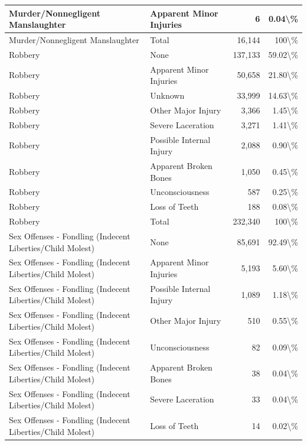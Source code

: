 \documentclass[
]{krantz}
\begin{document}
\begin{longtable}[t]{l|l|r|r}
\hline
Murder/Nonnegligent Manslaughter & Apparent Minor Injuries & 6 & 0.04\textbackslash{}\%\\
\hline
Murder/Nonnegligent Manslaughter & Total & 16,144 & 100\textbackslash{}\%\\
\hline
Robbery & None & 137,133 & 59.02\textbackslash{}\%\\
\hline
Robbery & Apparent Minor Injuries & 50,658 & 21.80\textbackslash{}\%\\
\hline
Robbery & Unknown & 33,999 & 14.63\textbackslash{}\%\\
\hline
Robbery & Other Major Injury & 3,366 & 1.45\textbackslash{}\%\\
\hline
Robbery & Severe Laceration & 3,271 & 1.41\textbackslash{}\%\\
\hline
Robbery & Possible Internal Injury & 2,088 & 0.90\textbackslash{}\%\\
\hline
Robbery & Apparent Broken Bones & 1,050 & 0.45\textbackslash{}\%\\
\hline
Robbery & Unconsciousness & 587 & 0.25\textbackslash{}\%\\
\hline
Robbery & Loss of Teeth & 188 & 0.08\textbackslash{}\%\\
\hline
Robbery & Total & 232,340 & 100\textbackslash{}\%\\
\hline
Sex Offenses - Fondling (Indecent Liberties/Child Molest) & None & 85,691 & 92.49\textbackslash{}\%\\
\hline
Sex Offenses - Fondling (Indecent Liberties/Child Molest) & Apparent Minor Injuries & 5,193 & 5.60\textbackslash{}\%\\
\hline
Sex Offenses - Fondling (Indecent Liberties/Child Molest) & Possible Internal Injury & 1,089 & 1.18\textbackslash{}\%\\
\hline
Sex Offenses - Fondling (Indecent Liberties/Child Molest) & Other Major Injury & 510 & 0.55\textbackslash{}\%\\
\hline
Sex Offenses - Fondling (Indecent Liberties/Child Molest) & Unconsciousness & 82 & 0.09\textbackslash{}\%\\
\hline
Sex Offenses - Fondling (Indecent Liberties/Child Molest) & Apparent Broken Bones & 38 & 0.04\textbackslash{}\%\\
\hline
Sex Offenses - Fondling (Indecent Liberties/Child Molest) & Severe Laceration & 33 & 0.04\textbackslash{}\%\\
\hline
Sex Offenses - Fondling (Indecent Liberties/Child Molest) & Loss of Teeth & 14 & 0.02\textbackslash{}\%\\

\end{longtable}
\end{document}
